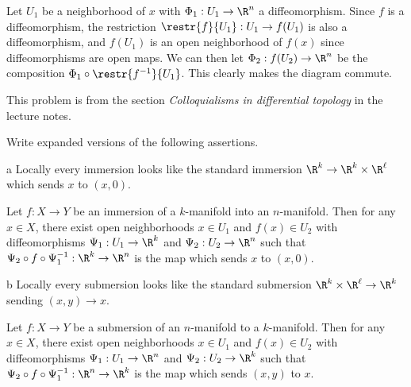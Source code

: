 \documentclass[11pt,letterpaper]{article}
\begin{document}
\begin{solution}
   \quad Let $U_1$ be a neighborhood of $x$ with $\Phi_1 : U_1 \to \R^n$ a diffeomorphism. Since $f$ is a diffeomorphism, the restriction $\restr{f}{U_1} : U_1 \to f(U_1)$ is also a diffeomorphism, and $f(U_1)$ is an open neighborhood of $f(x)$ since diffeomorphisms are open maps. We can then let $\Phi_2 : f(U_2) \to \R^n$ be the composition $\Phi_1\circ \restr{f^{-1}}{U_1}$. This clearly makes the diagram commute.  
\end{solution}

\begin{problem}
    This problem is from the section \textit{Colloquialisms in differential topology} in the lecture notes.
\end{problem}

\begin{solution}
    Write expanded versions of the following assertions.
    \begin{partproblem}{a}
        Locally every immersion looks like the standard immersion $\R^k \to \R^k \times \R^\ell$ which sends $x$ to $(x,0)$.
    \end{partproblem}

    \quad Let $f : X \to Y$ be an immersion of a $k$-manifold into an $n$-manifold. Then for any $x\in X$, there exist open neighborhoods $x\in U_1$ and $f(x)\in U_2$ with diffeomorphisms $\Psi_1 : U_1 \to \R^k$ and $\Psi_2 : U_2 \to \R^n$ such that $\Psi_2\circ f\circ\Psi_1^{-1} : \R^k \to \R^n$ is the map which sends $x$ to $(x,0)$.
    
    \begin{partproblem}{b}
        Locally every submersion looks like the standard submersion $\R^k\times \R^\ell \to \R^k$ sending $(x,y)\to x$.
    \end{partproblem}

    \quad Let $f : X \to Y$ be a submersion of an $n$-manifold to a $k$-manifold. Then for any $x\in X$, there exist open neighborhoods $x\in U_1$ and $f(x)\in U_2$ with diffeomorphisms $\Psi_1 : U_1 \to \R^n$ and $\Psi_2 : U_2 \to \R^k$ such that $\Psi_2\circ f\circ\Psi_1^{-1} : \R^n \to \R^k$ is the map which sends $(x,y)$ to $x$.


\end{solution}
\end{document}
